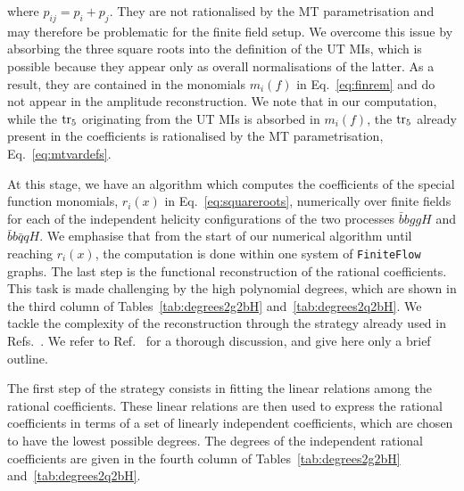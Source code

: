 \documentclass[main.tex]{subfiles}
\begin{document}
where $p_{ij} = p_i + p_j$.
They are not rationalised by the MT parametrisation and may therefore be problematic for the finite field setup. We overcome this issue by absorbing the three square roots into the definition of the UT MIs, which is possible because they appear only as overall normalisations of the latter. As a result, they are contained in the monomials $m_i(f)$ in Eq.~\ref{eq:finrem} and do not appear in the amplitude reconstruction. We note that in our computation, while the $\operatorname{\rm tr}_5$ originating from the UT MIs is absorbed in $m_i(f)$, the $\operatorname{\rm tr}_5$ already present in the coefficients is rationalised by the MT parametrisation, Eq.~\ref{eq:mtvardefs}. 

At this stage, we have an algorithm which computes the coefficients of the special function monomials, $r_i(x)$ in Eq.~\ref{eq:squareroots}, 
numerically over finite fields for each of the independent helicity configurations of the two processes $\bar{b}bggH$ and $\bar{b}b\bar{q}qH$. 
We emphasise that from the start of our numerical algorithm until reaching $r_i(x)$, the computation is done within one system of \texttt{FiniteFlow} graphs.
The last step is the functional reconstruction of the rational coefficients. This task is made challenging by the high polynomial degrees, which are shown in the third column of Tables~\ref{tab:degrees2g2bH} and~\ref{tab:degrees2q2bH}. We tackle the complexity of the reconstruction through the strategy already used in Refs.~\cite{Badger:2021nhg,Badger:2021imn}. We refer to Ref.~\cite{Badger:2021imn} for a thorough discussion, and give here only a brief outline. 

The first step of the strategy consists in fitting the linear relations among the rational coefficients. These linear relations are then used to express the rational coefficients in terms of a set of linearly independent coefficients, which are chosen to have the lowest possible degrees. The degrees of the independent rational coefficients are given in the fourth column of Tables~\ref{tab:degrees2g2bH} and~\ref{tab:degrees2q2bH}.
\end{document}

